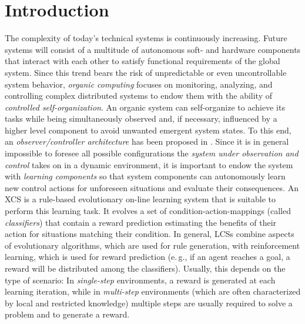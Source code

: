 \documentclass{sig-alternate}
\begin{document}


%

\section{Introduction}
\label{section:introduction}

The complexity of today's technical systems is continuously increasing. Future systems will consist of a multitude of autonomous soft- and hardware components that interact with each other to satisfy functional requirements of the global system. Since this trend bears the risk of unpredictable or even uncontrollable system behavior, \emph{organic computing} \cite{RMB+06} %
focuses on monitoring, analyzing, and controlling complex distributed systems to endow them with the ability of \emph{controlled self-organization}. An or\-ga\-nic system can self-organize to achieve its tasks while being simultaneously observed and, if necessary, influenced by a higher level component to avoid unwanted emergent system states. To this end, an \emph{observer/controller architecture} has been proposed in \cite{RMB+06}. %
Since it is in general impossible to foresee all possible configurations the \emph{system under observation and control} takes on in a dynamic environment, it is important to endow the system with \emph{learning components} so that system components can autonomously learn new control actions for unforeseen situations and evaluate their consequences. An XCS \cite{Wil95} is a rule-based evolutionary on-line learning system that is suitable to perform this learning task. It evolves a set of condition-action-mappings (called \emph{classifiers}) that contain a reward prediction estimating the benefits of their action for situations matching their condition. 
In general, LCSs combine aspects of evolutionary algorithms, which are used for rule generation, with reinforcement learning, which is used for reward prediction (e.\,g., if an agent reaches a goal, a reward will be distributed among the classifiers). 
Usually, this depends on the type of scenario: In \emph{single-step} environments, a reward is generated at each learning iteration, while in \emph{multi-step} environments (which are often characterized by local and restricted knowledge) 
multiple steps are usually required to solve a problem and to generate a reward.
\end{document}
